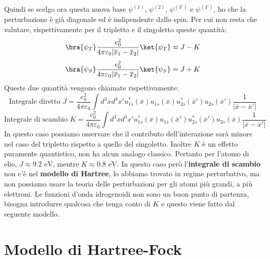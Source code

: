 Quindi se scelgo ora questa nuova base $\psi^{(1)}$, $\psi^{(2)}$, $\psi^{(3')}$ e $\psi^{(4')}$, ho che la perturbazione è già diagonale ed è indipendente dallo spin. Per cui non resta che valutare, rispettivamente per il tripletto e il singoletto queste quantità:
\begin{equation*}
    \bra{\psi_T}\frac{e_0^2}{4\pi\varepsilon_0|\overline{x}_1-\overline{x}_2|}\ket{\psi_T} = J - K
\end{equation*}
\begin{equation*}
    \bra{\psi_S}\frac{e_0^2}{4\pi\varepsilon_0|\overline{x}_1-\overline{x}_2|}\ket{\psi_S} = J + K
\end{equation*}
Queste due quantità vengono chiamate rispettivamente:
\begin{equation*}
    \text{Integrale diretto } J = \frac{e_0^2}{4\pi\varepsilon_0}\int d^3x d^3x'u_{1s}^*(\overline x)u_{1s}(\overline x)u_{2s}^*(\overline{x}')u_{2s}(\overline{x}')\frac{1}{|\overline x - \overline{x}'|}
\end{equation*}
\begin{equation*}
    \text{Integrale di scambio } K = \frac{e_0^2}{4\pi\varepsilon_0}\int d^3x d^3x'u_{1s}^*(\overline x)u_{1s}(\overline{x}')u_{2s}^*(\overline{x}')u_{2s}(\overline{x})\frac{1}{|\overline x - \overline{x}'|}
\end{equation*}
In questo caso possiamo osservare che il contributo dell'interazione sarà minore nel caso del tripletto rispetto a quello del singoletto. Inoltre $K$ è un effetto puramente quantistico, non ha alcun analogo classico.
Pertanto per l'atomo di elio, $J\approx 9.2 \text{ eV}$, mentre $K \approx 0.8 \text{ eV}$. In questo caso però l'\textbf{integrale di scambio} non c'è nel \textbf{modello di Hartree}, lo abbiamo trovato in regime perturbativo, ma non possiamo usare la teoria delle perturbazioni per gli atomi più grandi, a più elettroni. Le funzioni d'onda idrogenoidi non sono un buon punto di partenza, bisogna introdurre qualcosa che tenga conto di $K$ e questo viene fatto dal seguente modello.

\section{Modello di Hartree-Fock}


